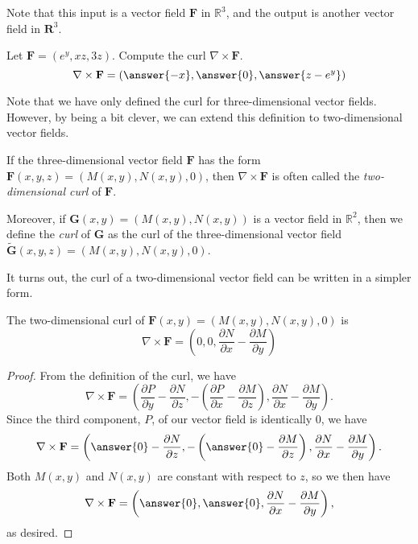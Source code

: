 \documentclass{ximera}
\begin{document}
Note that this input is a vector field $\mathbf{F}$ in $\mathbb{R}^3$, and the output is another vector field in $\mathbf{R}^3$.

\begin{problem}
Let $\mathbf{F}=(e^y, xz, 3z)$. Compute the curl $\nabla\times\mathbf{F}$.
\[
\nabla\times\mathbf{F} = \left(\answer{-x},\answer{0},\answer{z-e^y}\right)
\]
\end{problem}

Note that we have only defined the curl for three-dimensional vector fields. However, by being a bit clever, we can extend this definition to two-dimensional vector fields.

\begin{definition}
If the three-dimensional vector field $\mathbf{F}$ has the form $\mathbf{F}(x,y,z)=(M(x,y), N(x,y), 0)$, then $\nabla\times\mathbf{F}$ is often called the \emph{two-dimensional curl} of $\mathbf{F}$.

Moreover, if $\mathbf{G}(x,y)=(M(x,y), N(x,y))$ is a vector field in $\mathbb{R}^2$, then we define the \emph{curl} of $\mathbf{G}$ as the curl of the three-dimensional vector field $\widetilde{\mathbf{G}}(x,y,z)=(M(x,y),N(x,y),0)$.
\end{definition}

It turns out, the curl of a two-dimensional vector field can be written in a simpler form.

\begin{proposition}
The two-dimensional curl of $\mathbf{F}(x,y) = (M(x,y),N(x,y),0)$ is
\[
\nabla\times \mathbf{F} = \left(0,0,\dfrac{\partial N}{\partial x} - \dfrac{\partial M}{\partial y}\right)
\]
\end{proposition}

\begin{proof}
From the definition of the curl, we have
\[
\nabla\times\mathbf{F} = \left(\dfrac{\partial P}{\partial y}-\dfrac{\partial N}{\partial z}, -\left(\dfrac{\partial P}{\partial x}-\dfrac{\partial M}{\partial z}\right), \dfrac{\partial N}{\partial x} - \dfrac{\partial M}{\partial y}\right).
\]
Since the third component, $P$, of our vector field is identically $0$, we have
\[
\nabla\times\mathbf{F} = \left(\answer{0}-\dfrac{\partial N}{\partial z}, -\left(\answer{0}-\dfrac{\partial M}{\partial z}\right), \dfrac{\partial N}{\partial x} - \dfrac{\partial M}{\partial y}\right).
\]
Both $M(x,y)$ and $N(x,y)$ are constant with respect to $z$, so we then have
\[
\nabla\times\mathbf{F} = \left(\answer{0}, \answer{0}, \dfrac{\partial N}{\partial x} - \dfrac{\partial M}{\partial y}\right),
\]
as desired.
\end{proof}
\end{document}
